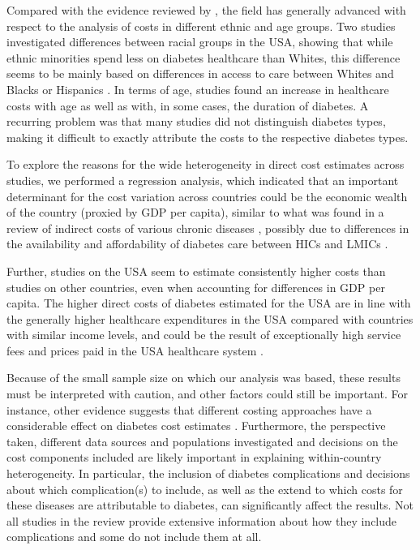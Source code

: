 \documentclass[12pt,english]{article}
\begin{document}
Compared with the evidence reviewed by \textcite{Ettaro2004}, the field has generally advanced with respect to the analysis of costs in different ethnic and age groups. Two studies investigated differences between racial groups in the USA, showing that while ethnic minorities spend less on diabetes healthcare than Whites, this difference seems to be mainly based on differences in access to care between Whites and Blacks or Hispanics \parencite{Lee2006,Buescher2010}. In terms of age, studies found an increase in healthcare costs with age as well as with, in some cases, the duration of diabetes. A recurring problem was that many studies did not distinguish diabetes types, making it difficult to exactly attribute the costs to the respective diabetes types.

To explore the reasons for the wide heterogeneity in direct cost estimates across studies, we performed a regression analysis, which indicated that an important determinant for the cost variation across countries could be the economic wealth of the country (proxied by \ac{GDP} per capita), similar to what was found in a review of indirect costs of various chronic diseases \parencite{Zhao2013}, possibly due to differences in the availability and affordability of diabetes care between \acp{HIC} and \acp{LMIC}  \parencite{Cameron2009g,Cameron2011b}. 

Further, studies on the USA seem to estimate consistently higher costs than studies on other countries, even when accounting for differences in \ac{GDP} per capita. The higher direct costs of diabetes estimated for the USA are in line with the generally higher healthcare expenditures in the USA compared with countries with similar income levels, and could be the result of exceptionally high service fees \parencite{Laugesen2011} and prices paid in the USA healthcare system \parencite{Squires2012,Lorenzoni2014}.

Because of the small sample size on which our analysis was based, these results must be interpreted with caution, and other factors could still be important. For instance, other evidence suggests that different costing approaches have a considerable effect on diabetes cost estimates \parencite{Tunceli2010c,Honeycutt2009a}. Furthermore, the perspective taken, different data sources and populations investigated and decisions on the cost components included are likely important in explaining within-country heterogeneity. In particular, the inclusion of diabetes complications and decisions about which complication(s) to include, as well as the extend to which costs for these diseases are attributable to diabetes, can significantly affect the results. Not all studies in the review provide extensive information about how they include complications and some do not include them at all.
\end{document}
